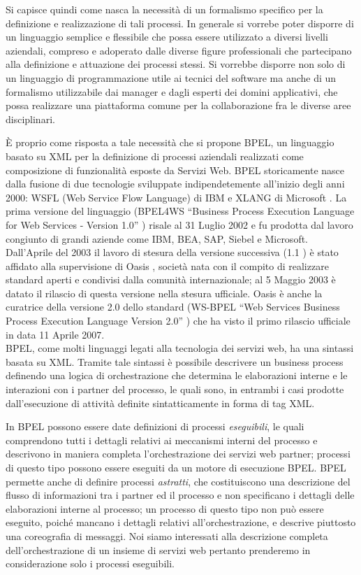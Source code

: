 Si capisce quindi come nasca la necessità di un formalismo specifico per la
definizione e realizzazione di tali processi. In generale si vorrebe poter
disporre di un linguaggio semplice e flessibile che possa essere utilizzato a
diversi livelli aziendali, compreso e adoperato dalle diverse figure
professionali che partecipano alla definizione e attuazione dei processi
stessi. Si vorrebbe disporre non solo di un linguaggio di programmazione
utile ai tecnici del software ma anche di un formalismo utilizzabile dai manager
e dagli esperti dei domini applicativi, che possa realizzare una piattaforma
comune per la collaborazione fra le diverse aree disciplinari.

\`E proprio come risposta a tale necessità che si propone BPEL, un linguaggio
basato su XML per la definizione di processi aziendali realizzati come
composizione di funzionalità esposte da Servizi Web. BPEL storicamente nasce
dalla fusione di due tecnologie sviluppate indipendetemente all'inizio degli
anni 2000: WSFL (Web Service Flow Language) di IBM \cite{WSFL} e XLANG di
Microsoft \cite{XLANG}. La prima versione del linguaggio (BPEL4WS ``Business
Process Execution Language for Web Services - Version 1.0'' \cite{BPEL10Spec}) risale al 31 Luglio 2002 e
fu prodotta dal lavoro congiunto di grandi aziende come IBM, BEA, SAP, Siebel e Microsoft. Dall'Aprile del 2003 il lavoro
di stesura della versione successiva (1.1 \cite{BPEL11Spec})  è stato affidato
alla supervisione di Oasis \cite{OASISSite}, società nata con il compito di
realizzare standard aperti e condivisi dalla comunità internazionale; al 5
Maggio 2003 è datato il rilascio di questa versione nella stesura ufficiale. Oasis è  anche la curatrice della
versione 2.0 dello standard (WS-BPEL ``Web Services Business Process Execution
Language Version 2.0'' \cite{BPEL20Spec}) che ha visto il primo rilascio
ufficiale in data 11 Aprile 2007.
\\

BPEL, come molti linguaggi legati alla tecnologia dei servizi web, ha una
sintassi basata su XML. Tramite tale sintassi è possibile descrivere un business
process definendo una logica di orchestrazione che determina le elaborazioni
interne e le interazioni con i partner del processo, le quali sono, in entrambi
i casi prodotte dall’esecuzione di attività definite sintatticamente in forma di
tag XML.

In BPEL possono essere date definizioni di processi \emph{eseguibili}, le quali
comprendono  tutti i dettagli relativi ai meccanismi interni del processo e
descrivono in maniera completa l’orchestrazione dei servizi web partner; 
processi di questo tipo possono essere eseguiti da un motore di esecuzione BPEL. 
BPEL permette anche di definire processi \emph{astratti}, che costituiscono una
descrizione del flusso di informazioni tra i partner ed il processo e non
specificano i dettagli delle elaborazioni interne al processo; un processo
di questo tipo non può essere eseguito, poiché mancano i dettagli relativi     
all'orchestrazione, e descrive piuttosto una coreografia di messaggi.
Noi siamo interessati alla descrizione completa dell'orchestrazione di un
insieme di servizi web pertanto
prenderemo in considerazione solo i processi eseguibili.

